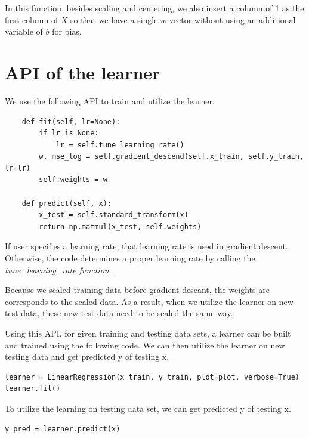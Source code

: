 \documentclass[
	letterpaper
]{article}
\begin{document}
In this function, besides scaling and centering, we also insert a column of 1 as the first column of $X$ so that we have a single $w$ vector without using an additional variable of $b$ for bias.

\section{API of the learner}
We use the following API to train and utilize the learner.
\begin{lstlisting}
    def fit(self, lr=None):
        if lr is None:
            lr = self.tune_learning_rate()
        w, mse_log = self.gradient_descend(self.x_train, self.y_train, lr=lr)
        self.weights = w
    
    def predict(self, x):
        x_test = self.standard_transform(x)
        return np.matmul(x_test, self.weights)
\end{lstlisting}
If user specifies a learning rate, that learning rate is used in gradient descent. Otherwise, the code determines a proper learning rate by calling the \textit{tune\_learning\_rate function}.

Because we scaled training data before gradient descant, the weights are corresponds to the scaled data. 
As a result, when we utilize the learner on new test data, these new test data need to be scaled the same way.

Using this API, for given training and testing data sets, a learner can be built and trained using the following code. We can then utilize the learner on new testing data and get predicted y of testing x.
\begin{lstlisting}
learner = LinearRegression(x_train, y_train, plot=plot, verbose=True)
learner.fit()
\end{lstlisting}

To utilize the learning on testing data set, we can get predicted y of testing x.
\begin{lstlisting}
y_pred = learner.predict(x)
\end{lstlisting}
\end{document}
